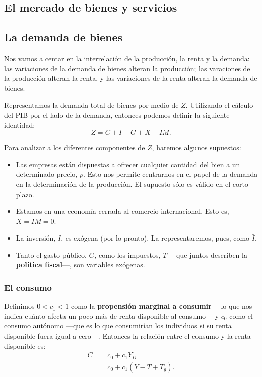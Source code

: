\documentclass[10pt, landscape]{article}
\begin{document}
\begin{multicols*}{3}
\section{El mercado de bienes y servicios}

\subsection{La demanda de bienes}
Nos vamos a centar en la interrelación de la producción, la renta y la demanda: las variaciones de la demanda de bienes alteran la producción; las varaciones de la producción alteran la renta, y las variaciones de la renta alteran la demanda de bienes.

Representamos la demanda total de bienes por medio de $Z$. Utilizando el cálculo del PIB por el lado de la demanda, entonces podemos definir la siguiente identidad:
\[ Z  = C + I + G + X - IM.\]

Para analizar a los diferentes componentes de $Z$, haremos algunos supuestos:
\begin{itemize}
    \item Las empresas están dispuestas a ofrecer cualquier cantidad del bien a un determinado precio, $p$. Esto nos permite centrarnos en el papel de la demanda en la determinación de la producción. El supuesto sólo es válido en el corto plazo.
    \item Estamos en una economía cerrada al comercio internacional. Esto es, $X=IM=0$.
    \item La inversión, $I$, es exógena (por lo pronto). La representaremos, pues, como $\bar{I}$.
    \item Tanto el gasto público, $G$, como los impuestos, $T$ ---que juntos describen la \textbf{política fiscal}---, son variables exógenas.
\end{itemize}

\subsubsection{El consumo}
Definimos $0<c_1<1$ como la \textbf{propensión marginal a consumir} ---lo que nos indica cuánto afecta un poco más de renta disponible al consumo--- y $c_0$ como el consumo autónomo ---que es lo que consumirían los individuos si su renta disponible fuera igual a cero---. Entonces la relación entre el consumo y la renta disponible es:
\begin{align*}
    C &= c_0 + c_1Y_D    \\
      &= c_0 + c_1(Y-T+T_g).
\end{align*}


\end{multicols*}
\end{document}
